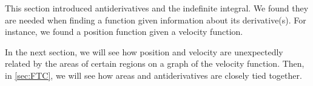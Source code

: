 This section introduced antiderivatives and the indefinite integral. We found they are needed when finding a function given information about its derivative(s). For instance, we found a position function given a velocity function.

In the next section, we will see how position and velocity are unexpectedly related by the areas of certain regions on a graph of the velocity function. Then, in \autoref{sec:FTC}, we will see how areas and antiderivatives are closely tied together.

